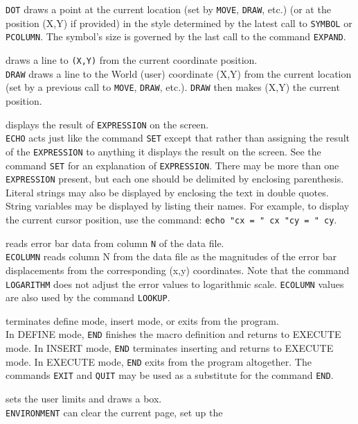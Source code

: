 	{\tt DOT} draws a point at the current location (set by
	{\tt MOVE},
	{\tt DRAW}, etc.)
	(or at the position (X,Y) if provided) in the style determined by
	the latest call to {\tt SYMBOL} or
	{\tt PCOLUMN}.  The symbol's size is
	governed by the last call to the command
	{\tt EXPAND}.
\item [{\tt DRAW X Y } --] draws a line to {\tt (X,Y)} from the current coordinate position.\\
	{\tt DRAW} draws a line to the World (user) coordinate (X,Y)
	from the current location (set by a previous call to
	{\tt MOVE},
	{\tt DRAW}, etc.).
	{\tt DRAW} then makes (X,Y) the current position.
\item [{\tt ECHO EXPRESSION [\dots] } --] displays the result of {\tt EXPRESSION} on the screen.\\
	{\tt ECHO} acts just like the command
	{\tt SET} except that rather than assigning
	the result of the {\tt EXPRESSION} to anything it displays
	the result on the screen.  See the command
	{\tt SET} for an explanation of
	{\tt EXPRESSION}.  There may be more than one
	{\tt EXPRESSION} present, but each one should be delimited
	by enclosing parenthesis.  Literal strings may also be displayed
	by enclosing the text in double quotes.  String variables may be
	displayed by listing their names.  For example, to display the
	current cursor position, use the command:
	{\tt echo "cx = " cx "cy = " cy}.
\item [{\tt ECOLUMN N } --] reads error bar data from column {\tt N} of the data file.\\
	{\tt ECOLUMN} reads column N from the data file as the
	magnitudes of the error bar displacements from the corresponding (x,y)
	coordinates.  Note that the command
	{\tt LOGARITHM}
	does not adjust the error values to logarithmic scale.
	{\tt ECOLUMN} values are also used by the command
	{\tt LOOKUP}.
\item [{\tt END } --] terminates define mode, insert mode, or exits from the program.\\
	In DEFINE mode, {\tt END} finishes the macro definition
	and returns to EXECUTE mode.  In INSERT mode, {\tt END}
	terminates inserting and returns to EXECUTE mode.  In EXECUTE
	mode, {\tt END} exits from the program altogether.
	The commands {\tt EXIT} and {\tt QUIT} may be
	used as a substitute for the command {\tt END}.
\item [{\tt ENVIRONMENT [X1 X2 Y1 Y2 [N [K]]] } --] sets the user limits and draws a box.\\
	{\tt ENVIRONMENT} can clear the current page, set up the
